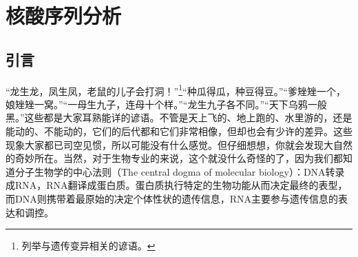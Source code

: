 \documentclass[11pt,a4paper,twoside]{book}
\begin{document}
\setcounter{chapter}{3}
\chapter{核酸序列分析}

\noindent
{}

\section{引言}
  “龙生龙，凤生凤，老鼠的儿子会打洞！”\footnote{列举与遗传变异相关的谚语。}“种瓜得瓜，种豆得豆。”“爹矬矬一个，娘矬矬一窝。”“一母生九子，连母十个样。”“龙生九子各不同。”“天下乌鸦一般黑。”这些都是大家耳熟能详的谚语。不管是天上飞的、地上跑的、水里游的，还是能动的、不能动的，它们的后代都和它们非常相像，但却也会有少许的差异。这些现象大家都已司空见惯，所以可能没有什么感觉。但仔细想想，你就会发现大自然的奇妙所在。当然，对于生物专业的来说，这个就没什么奇怪的了，因为我们都知道分子生物学的中心法则（The central dogma of molecular biology）：DNA转录成RNA，RNA翻译成蛋白质。蛋白质执行特定的生物功能从而决定最终的表型，而DNA则携带着最原始的决定个体性状的遗传信息，RNA主要参与遗传信息的表达和调控。
\end{document}
